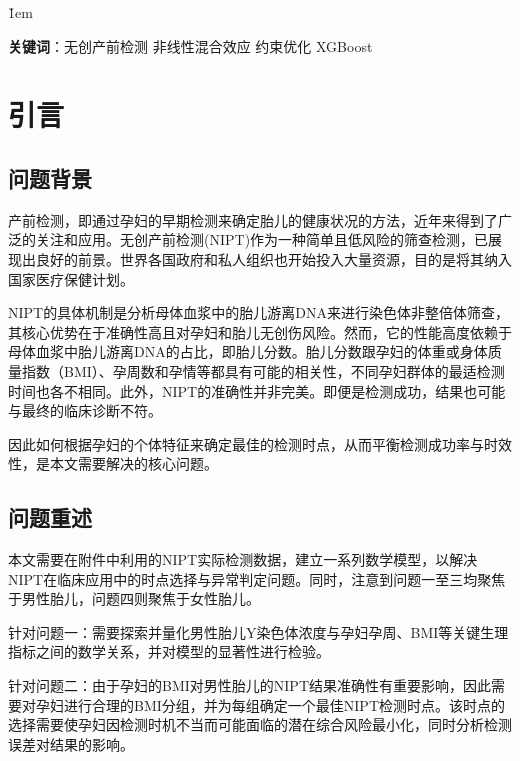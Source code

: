 \documentclass[a4paper, oneside, 12pt]{article}
\begin{document}
\v{1em}

\noindent
\textbf{关键词}：无创产前检测 \quad 非线性混合效应 \quad 约束优化 \quad XGBoost

\newpage




\section{引言}

\subsection{问题背景}

产前检测，即通过孕妇的早期检测来确定胎儿的健康状况的方法，近年来得到了广泛的关注和应用。无创产前检测(NIPT)作为一种简单且低风险的筛查检测，已展现出良好的前景。世界各国政府和私人组织也开始投入大量资源，目的是将其纳入国家医疗保健计划\cite{jayashankar2023non}。

NIPT的具体机制是分析母体血浆中的胎儿游离DNA来进行染色体非整倍体筛查，其核心优势在于准确性高且对孕妇和胎儿无创伤风险。然而，它的性能高度依赖于母体血浆中胎儿游离DNA的占比，即胎儿分数。胎儿分数跟孕妇的体重或身体质量指数（BMI）、孕周数和孕情等都具有可能的相关性，不同孕妇群体的最适检测时间也各不相同。此外，NIPT的准确性并非完美。即便是检测成功，结果也可能与最终的临床诊断不符。

因此如何根据孕妇的个体特征来确定最佳的检测时点，从而平衡检测成功率与时效性，是本文需要解决的核心问题。

\subsection{问题重述}

本文需要在附件中利用的NIPT实际检测数据，建立一系列数学模型，以解决NIPT在临床应用中的时点选择与异常判定问题。同时，注意到问题一至三均聚焦于男性胎儿，问题四则聚焦于女性胎儿。

针对问题一：需要探索并量化男性胎儿Y染色体浓度与孕妇孕周、BMI等关键生理指标之间的数学关系，并对模型的显著性进行检验。

针对问题二：由于孕妇的BMI对男性胎儿的NIPT结果准确性有重要影响，因此需要对孕妇进行合理的BMI分组，并为每组确定一个最佳NIPT检测时点。该时点的选择需要使孕妇因检测时机不当而可能面临的潜在综合风险最小化，同时分析检测误差对结果的影响。
\end{document}
